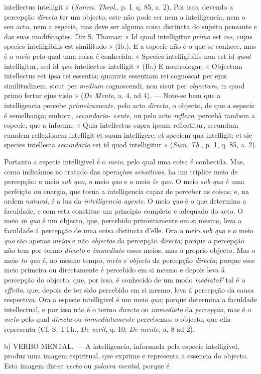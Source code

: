 intellectus intelligit » (\emph{Summ}. \emph{Theol}., p. I. q. 85, a. 2). Por isso, devendo a percepção \emph{directa} ter um objecto, este não pode ser nem a intelligencia, nem o seu acto, nem a especie, mas deve ser alguma coisa distincta do sujeito pensante e das suas modificações. Diz S. Thomaz: « Id quod intelligitur \emph{primo} est \emph{res}, cujus species intelligibilis est similitudo » (Ib.). E a especie não é o que se conhece, mas é o \emph{meio} pelo qual uma coisa é conhecida: « Species intelligibilis non est id \emph{quod} intelligitur, sed id \emph{qwo} intellectus intelligit » (Ib.) E noutrologar: « Objectum intellectus est ipsa rei essentia; quamvis essentiam rei cognoscat per ejus similitudinem, sicut per \emph{medium} cognoscendi, non sicut per \emph{objectwm}, in quod primo fertur ejus visio » (\emph{De Mente}, a. 4, ad 4). --- Note-se bem que a intelligencia percebe \emph{primeiramente}, pelo acto \emph{directo}, o objecto, de que a especie é semelhança; embora, \emph{secundaria}- «\emph{ente}, ou pelo acto \emph{reflexo}, percebà tambem a especie, que a informa: « Quia intellectus supra ipsum reflectitur, secundum eamdem reflexionem intelligit et suum intelligere, et speciem qua intelligit; et sic species intellecta \emph{secundario} est id quod intelligitur » (\emph{Sum}. \emph{Th}., p. 1, q. 85, a. 2).\par Portanto a especie intelligivel é o \emph{meio}, pelo qual uma coisa é conhecida. Mas, como indicámos no tratado das operações \emph{sensitivas}, ha um triplice meio de percepção: o meio \emph{sub quo}, o meio \emph{quo} e o meio \emph{i}» \emph{quo}. O meio \emph{sub quo} é uma perfeição ou energia, que torna a intelligencia capaz de perceber as coisas; e, na ordem \emph{natural}, é a luz da \emph{intelligencia agente}. O meio \emph{quo} é o que determina a faculdade, e com esta constitue um principio completo e adequado do acto. O meio \emph{in quo} é um objecto, que, percebido primeiramente em si mesmo, leva a faculdade á percepção de uma coisa distincta d'elle. Ora o meio \emph{sub quo} e o meio \emph{quo} são apenas \emph{meios} e não \emph{objectos} da percepção \emph{directa}; porque a percepção não tem por termo \emph{directo} e \emph{immediato} esses meios, mas o proprio objecto. Mas o meio \emph{tn quo} é, ao mesmo tempo, \emph{meto} e \emph{objecto} da percepção \emph{directa}; porque esse meio primeira ou directamente é percebido em si mesmo e depois leva á percepção do objecto, que, por isso, é conhecido de um modo \emph{mediatoF} tal é o \emph{effeito}, que, depois de ter sido percebido em si mesmo, leva á percepção da causa respectiva. Ora a especie intelligivel é um meio \emph{quo}; porque determina a faculdade intellectual, e por isso não é o termo \emph{directo} ou \emph{immediato} da \emph{percepção}, mas é o \emph{meio} pelo qual \emph{directa} ou \emph{immediatamente} percebemos o objecto, que ella representa (Cf. S. TTh., \emph{De verit}, q. 10; \emph{De mente}, a. 8 ad 2).\par b) \textsc{VERBO} MENTAL. --- A intelligencia, informada pela especie intelligivel, produz uma imagem espiritual, que exprime e representa a essencia do objecto. Esta imagem diz-se \emph{verbo} ou \emph{palavra mental}, porque é 